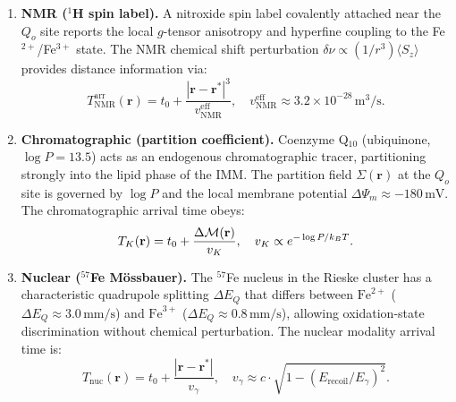 \begin{enumerate}[label=(\arabic*),leftmargin=2em]
\item \textbf{NMR ($^1$H spin label).}
  A nitroxide spin label covalently attached near the $Q_o$ site reports the
  local $g$-tensor anisotropy and hyperfine coupling to the Fe$^{2+}$/Fe$^{3+}$
  state.  The NMR chemical shift perturbation $\delta\nu \propto
  (1/r^3)\langle S_z\rangle$ provides distance information via:
  \[
    T_\text{NMR}^\text{arr}(\mathbf{r})
    = t_0 + \frac{|\mathbf{r}-\mathbf{r}^*|^3}{v_\text{NMR}^\text{eff}},
    \quad v_\text{NMR}^\text{eff}
    \approx 3.2\times10^{-28}\,\text{m}^3/\text{s}.
  \]

\item \textbf{Chromatographic (partition coefficient).}
  Coenzyme Q$_{10}$ (ubiquinone, $\log P = 13.5$) acts as an endogenous
  chromatographic tracer, partitioning strongly into the lipid phase of the
  IMM.  The partition field $\Sigma(\mathbf{r})$ at the $Q_o$ site is
  governed by $\log P$ and the local membrane potential $\Delta\Psi_m
  \approx -180\,\text{mV}$.  The chromatographic arrival time obeys:
  \[
    T_K(\mathbf{r}) = t_0 + \frac{\Delta\mathcal{M}(\mathbf{r})}{v_K},
    \quad v_K \propto e^{-\log P/k_BT}.
  \]

\item \textbf{Nuclear ($^{57}$Fe M\"{o}ssbauer).}
  The $^{57}$Fe nucleus in the Rieske cluster has a characteristic
  quadrupole splitting $\Delta E_Q$ that differs between
  $\text{Fe}^{2+}$ ($\Delta E_Q \approx 3.0\,\text{mm/s}$) and
  $\text{Fe}^{3+}$ ($\Delta E_Q \approx 0.8\,\text{mm/s}$), allowing
  oxidation-state discrimination without chemical perturbation.
  The nuclear modality arrival time is:
  \[
    T_\text{nuc}(\mathbf{r}) = t_0 + \frac{|\mathbf{r}-\mathbf{r}^*|}
    {v_\gamma}, \quad v_\gamma \approx c \cdot \sqrt{1 - (E_\text{recoil}/E_\gamma)^2}.
  \]
\end{enumerate}


